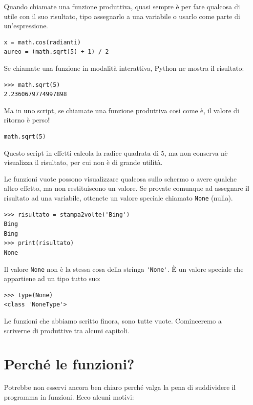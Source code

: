 \documentclass[10pt]{book}
\begin{document}
Quando chiamate una funzione produttiva, quasi sempre è per fare qualcosa di utile con il suo risultato, tipo assegnarlo a una variabile o usarlo come parte di un'espressione.

\begin{verbatim}
x = math.cos(radianti)
aureo = (math.sqrt(5) + 1) / 2
\end{verbatim}
%
Se chiamate una funzione in modalità interattiva, Python ne mostra il risultato:

\begin{verbatim}
>>> math.sqrt(5)
2.2360679774997898
\end{verbatim}
%
Ma in uno script, se chiamate una funzione produttiva così come è, il valore di ritorno è perso!

\begin{verbatim}
math.sqrt(5)
\end{verbatim}
%
Questo script in effetti calcola la radice quadrata di 5, ma non conserva nè visualizza il risultato, per cui non è di grande utilità.

Le funzioni vuote possono visualizzare qualcosa sullo schermo o avere qualche altro effetto, ma non restituiscono un valore. Se provate comunque ad assegnare il risultato ad una variabile, ottenete un valore speciale chiamato
{\tt None} (nulla).

\begin{verbatim}
>>> risultato = stampa2volte('Bing')
Bing
Bing
>>> print(risultato)
None
\end{verbatim}
%
Il valore {\tt None} non è la stessa cosa della stringa \verb"'None'". 
È un valore speciale che appartiene ad un tipo tutto suo:

\begin{verbatim}
>>> type(None)
<class 'NoneType'>
\end{verbatim}
%
Le funzioni che abbiamo scritto finora, sono tutte vuote. Cominceremo a scriverne di produttive tra alcuni capitoli.


\section{Perché le funzioni?}

Potrebbe non esservi ancora ben chiaro perché valga la pena di suddividere il programma in funzioni. Ecco alcuni motivi:
\end{document}
